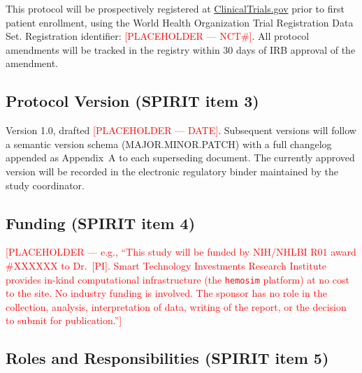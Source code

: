 \documentclass[11pt]{article}
\begin{document}
This protocol will be prospectively registered at \url{ClinicalTrials.gov} prior to first patient enrollment, using the World Health Organization Trial Registration Data Set. Registration identifier: \textcolor{red}{[PLACEHOLDER --- NCT\#]}. All protocol amendments will be tracked in the registry within 30 days of IRB approval of the amendment.

\subsection{Protocol Version (SPIRIT item 3)}

Version 1.0, drafted \textcolor{red}{[PLACEHOLDER --- DATE]}. Subsequent versions will follow a semantic version schema (MAJOR.MINOR.PATCH) with a full changelog appended as Appendix~A to each superseding document. The currently approved version will be recorded in the electronic regulatory binder maintained by the study coordinator.

\subsection{Funding (SPIRIT item 4)}

\textcolor{red}{[PLACEHOLDER --- e.g., ``This study will be funded by NIH/NHLBI R01 award \#XXXXXX to Dr.\ [PI]. Smart Technology Investments Research Institute provides in-kind computational infrastructure (the \texttt{hemosim} platform) at no cost to the site. No industry funding is involved. The sponsor has no role in the collection, analysis, interpretation of data, writing of the report, or the decision to submit for publication.'']}

\subsection{Roles and Responsibilities (SPIRIT item 5)}
\end{document}
